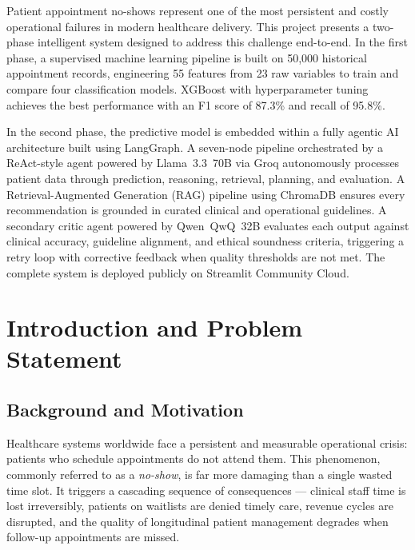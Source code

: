 \documentclass[12pt, a4paper]{report}
\begin{document}
Patient appointment no-shows represent one of the most persistent and costly operational failures in modern healthcare delivery. This project presents a two-phase intelligent system designed to address this challenge end-to-end. In the first phase, a supervised machine learning pipeline is built on 50,000 historical appointment records, engineering 55 features from 23 raw variables to train and compare four classification models. XGBoost with hyperparameter tuning achieves the best performance with an F1 score of 87.3\% and recall of 95.8\%.

In the second phase, the predictive model is embedded within a fully agentic AI architecture built using LangGraph. A seven-node pipeline orchestrated by a ReAct-style agent powered by Llama~3.3~70B via Groq autonomously processes patient data through prediction, reasoning, retrieval, planning, and evaluation. A Retrieval-Augmented Generation (RAG) pipeline using ChromaDB ensures every recommendation is grounded in curated clinical and operational guidelines. A secondary critic agent powered by Qwen~QwQ~32B evaluates each output against clinical accuracy, guideline alignment, and ethical soundness criteria, triggering a retry loop with corrective feedback when quality thresholds are not met. The complete system is deployed publicly on Streamlit Community Cloud.

\chapter{Introduction and Problem Statement}

\section{Background and Motivation}

Healthcare systems worldwide face a persistent and measurable operational crisis: patients who schedule appointments do not attend them. This phenomenon, commonly referred to as a \textit{no-show}, is far more damaging than a single wasted time slot. It triggers a cascading sequence of consequences --- clinical staff time is lost irreversibly, patients on waitlists are denied timely care, revenue cycles are disrupted, and the quality of longitudinal patient management degrades when follow-up appointments are missed.
\end{document}
